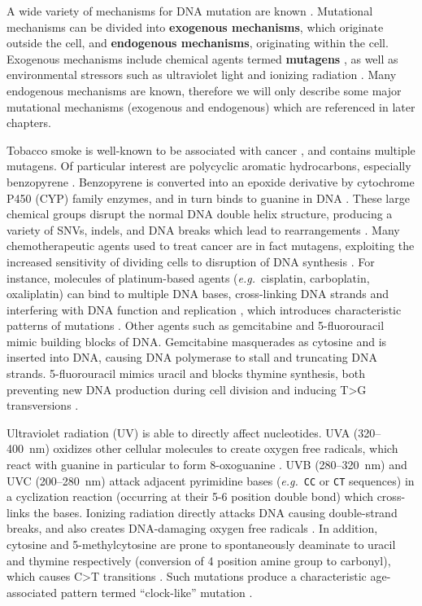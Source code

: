 A wide variety of mechanisms for DNA mutation are known \cite{chakarov2014}. Mutational mechanisms can be divided into \textbf{exogenous mechanisms}, which originate outside the cell, and \textbf{endogenous mechanisms}, originating within the cell. Exogenous mechanisms include chemical agents termed \textbf{mutagens} \cite{benigni2011}, as well as environmental stressors such as ultraviolet light \cite{pfeifer2005} and ionizing radiation \cite{little2000}. Many endogenous mechanisms are known, therefore we will only describe some major mutational mechanisms (exogenous and endogenous) which are referenced in later chapters.

Tobacco smoke is well-known to be associated with cancer \cite{obe1984}, and contains multiple mutagens. Of particular interest are polycyclic aromatic hydrocarbons, especially benzopyrene \cite{demarini2004}. Benzopyrene is converted into an epoxide derivative by cytochrome P450 (CYP) family enzymes, and in turn binds to guanine in DNA \cite{iarc2012}. These large chemical groups disrupt the normal DNA double helix structure, producing a variety of SNVs, indels, and DNA breaks which lead to rearrangements \cite{cosmic_ms}. Many chemotherapeutic agents used to treat cancer are in fact mutagens, exploiting the increased sensitivity of dividing cells to disruption of DNA synthesis \cite{ferguson1996}. For instance, molecules of platinum-based agents (\textit{e.g.}\ cisplatin, carboplatin, oxaliplatin) can bind to multiple DNA bases, cross-linking DNA strands and interfering with DNA function and replication \cite{chen2013}, which introduces characteristic patterns of mutations \cite{pich2019}. Other agents such as gemcitabine and 5\nobreakdash-fluorouracil mimic building blocks of DNA\@. Gemcitabine masquerades as cytosine and is inserted into DNA, causing DNA polymerase to stall and truncating DNA strands. 5\nobreakdash-fluorouracil mimics uracil and blocks thymine synthesis, both preventing new DNA production during cell division and inducing T\textgreater{}G transversions \cite{christensen2019}.

Ultraviolet radiation (UV) is able to directly affect nucleotides. UVA (320--400~nm) oxidizes other cellular molecules to create oxygen free radicals, which react with guanine in particular to form 8-oxoguanine \cite{kielbassa1997}. UVB (280--320~nm) and UVC (200--280~nm) attack adjacent pyrimidine bases (\textit{e.g.}\ \texttt{CC} or \texttt{CT} sequences) in a cyclization reaction (occurring at their 5-6 position double bond) which cross-links the bases. Ionizing radiation directly attacks DNA causing double-strand breaks, and also creates DNA-damaging oxygen free radicals \cite{santivasi2014}. In addition, cytosine and 5-methylcytosine are prone to spontaneously deaminate to uracil and thymine respectively (conversion of 4 position amine group to carbonyl), which causes C\textgreater{}T transitions \cite{lewis2016}. Such mutations produce a characteristic age-associated pattern termed ``clock-like'' mutation \cite{alexandrov2015}.

